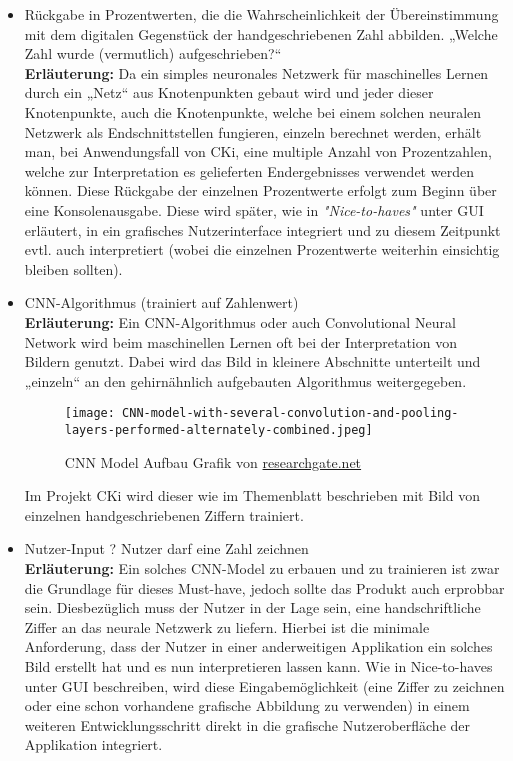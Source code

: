 \begin{itemize}
	\item 
	Rückgabe in Prozentwerten, die die Wahrscheinlichkeit der Übereinstimmung mit dem digitalen Gegenstück der handgeschriebenen Zahl abbilden. „Welche Zahl wurde (vermutlich) aufgeschrieben?“
	\\
	\textbf{Erläuterung:}
	Da ein simples neuronales Netzwerk für maschinelles Lernen durch ein „Netz“ aus Knotenpunkten gebaut wird und jeder dieser Knotenpunkte, auch die Knotenpunkte, welche bei einem solchen neuralen Netzwerk als Endschnittstellen fungieren, einzeln berechnet werden, erhält man, bei Anwendungsfall von CKi, eine multiple Anzahl von Prozentzahlen, welche zur Interpretation es gelieferten Endergebnisses verwendet werden können. Diese Rückgabe der einzelnen Prozentwerte erfolgt zum Beginn über eine Konsolenausgabe. Diese wird später, wie in \textit{"Nice-to-haves"} unter GUI erläutert, in ein grafisches Nutzerinterface integriert und zu diesem Zeitpunkt evtl. auch interpretiert (wobei die einzelnen Prozentwerte weiterhin einsichtig bleiben sollten).
	
	\item CNN-Algorithmus (trainiert auf Zahlenwert)
	\\
	\textbf{Erläuterung:}
	Ein CNN-Algorithmus oder auch Convolutional Neural Network wird beim maschinellen Lernen oft bei der Interpretation von Bildern genutzt. Dabei wird das Bild in kleinere Abschnitte unterteilt und „einzeln“ an den gehirnähnlich aufgebauten Algorithmus weitergegeben.
	\begin{figure}[H]
		\centering
		\texttt{[image: CNN-model-with-several-convolution-and-pooling-layers-performed-alternately-combined.jpeg]}
		\caption{CNN Model Aufbau Grafik von \href{https://www.researchgate.net/publication/309751512_Content-Aware_Convolutional_Neural_Network_for_Object_Recognition_Task}{researchgate.net}}
		\label{fig:AnalyseCNN-model-with-several-convolution-and-pooling-layers-performed-alternately-combined}
	\end{figure}
	Im Projekt CKi wird dieser wie im Themenblatt beschrieben mit Bild von einzelnen handgeschriebenen Ziffern trainiert.
	
	\item Nutzer-Input ? Nutzer darf eine Zahl zeichnen
	\\
	\textbf{Erläuterung:}
	Ein solches CNN-Model zu erbauen und zu trainieren ist zwar die Grundlage für dieses Must-have, jedoch sollte das Produkt auch erprobbar sein. Diesbezüglich muss der Nutzer in der Lage sein, eine handschriftliche Ziffer an das neurale Netzwerk zu liefern. Hierbei ist die minimale Anforderung, dass der Nutzer in einer anderweitigen Applikation ein solches Bild erstellt hat und es nun interpretieren lassen kann. Wie in Nice-to-haves unter GUI beschreiben, wird diese Eingabemöglichkeit (eine Ziffer zu zeichnen oder eine schon vorhandene grafische Abbildung zu verwenden) in einem weiteren Entwicklungsschritt direkt in die grafische Nutzeroberfläche der Applikation integriert.
	

\end{itemize}
